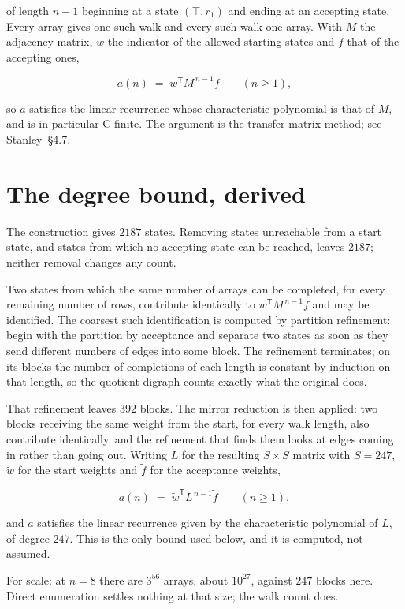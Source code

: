\documentclass[11pt]{article}
\theoremstyle{definition}
\begin{document}
of length $n-1$ beginning at a state $(\top,r_1)$ and ending at an accepting state. Every array gives one such walk and every such walk one array. With $M$ the adjacency matrix, $w$ the indicator of the allowed starting states and $f$ that of the accepting ones,

\[a(n) \;=\; w^{\mathsf T} M^{\,n-1} f \qquad (n \ge 1),\]

so $a$ satisfies the linear recurrence whose characteristic polynomial is that of $M$, and is in particular C-finite. The argument is the transfer-matrix method; see Stanley~\S4.7.

\section{The degree bound, derived}

The construction gives $2187$ states. Removing states unreachable from a start state, and states from which no accepting state can be reached, leaves $2187$; neither removal changes any count.

Two states from which the same number of arrays can be completed, for every remaining number of rows, contribute identically to $w^{\mathsf T}M^{\,n-1}f$ and may be identified. The coarsest such identification is computed by partition refinement: begin with the partition by acceptance and separate two states as soon as they send different numbers of edges into some block. The refinement terminates; on its blocks the number of completions of each length is constant by induction on that length, so the quotient digraph counts exactly what the original does.

That refinement leaves $392$ blocks. The mirror reduction is then applied: two blocks receiving the same weight from the start, for every walk length, also contribute identically, and the refinement that finds them looks at edges coming in rather than going out. Writing $L$ for the resulting $S \times S$ matrix with $S = 247$, $\tilde w$ for the start weights and $\tilde f$ for the acceptance weights,

\[a(n) \;=\; \tilde w^{\mathsf T} L^{\,n-1} \tilde f \qquad (n \ge 1),\]

and $a$ satisfies the linear recurrence given by the characteristic polynomial of $L$, of degree $247$. This is the only bound used below, and it is computed, not assumed.

For scale: at $n = 8$ there are $3^{56}$ arrays, about $10^{27}$, against $247$ blocks here. Direct enumeration settles nothing at that size; the walk count does.
\end{document}
